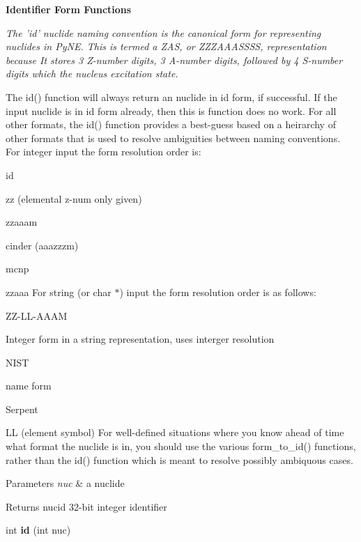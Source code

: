 \begin{Indent}{\bf Identifier Form Functions}\par
{\em The 'id' nuclide naming convention is the canonical form for representing nuclides in Py\-N\-E. This is termed a Z\-A\-S, or Z\-Z\-Z\-A\-A\-A\-S\-S\-S\-S, representation because It stores 3 Z-\/number digits, 3 A-\/number digits, followed by 4 S-\/number digits which the nucleus excitation state.

The id() function will always return an nuclide in id form, if successful. If the input nuclide is in id form already, then this is function does no work. For all other formats, the id() function provides a best-\/guess based on a heirarchy of other formats that is used to resolve ambiguities between naming conventions. For integer input the form resolution order is\-:
\begin{DoxyItemize}
\item id
\item zz (elemental z-\/num only given)
\item zzaaam
\item cinder (aaazzzm)
\item mcnp
\item zzaaa For string (or char $\ast$) input the form resolution order is as follows\-:
\item Z\-Z-\/\-L\-L-\/\-A\-A\-A\-M
\item Integer form in a string representation, uses interger resolution
\item N\-I\-S\-T
\item name form
\item Serpent
\item L\-L (element symbol) For well-\/defined situations where you know ahead of time what format the nuclide is in, you should use the various form\-\_\-to\-\_\-id() functions, rather than the id() function which is meant to resolve possibly ambiquous cases. 
\begin{DoxyParams}{Parameters}
{\em nuc} & a nuclide \\
\hline
\end{DoxyParams}
\begin{DoxyReturn}{Returns}
nucid 32-\/bit integer identifier 
\end{DoxyReturn}

\end{DoxyItemize}}\begin{DoxyCompactItemize}
\item 
\hypertarget{namespacepyne_1_1nucname_a179fb56293a25041720035d6ca7a56c5}{int {\bfseries id} (int nuc)}\label{namespacepyne_1_1nucname_a179fb56293a25041720035d6ca7a56c5}


\end{DoxyCompactItemize}
\end{Indent}
